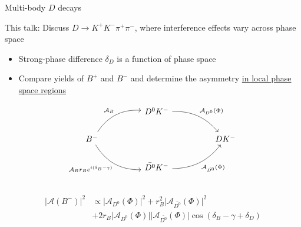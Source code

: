 \documentclass[xcolor={dvipsnames}]{beamer}
\begin{document}
\begin{frame}[fragile]{Multi-body $D$ decays}
  \begin{center}
    This talk: Discuss $D\to K^+K^-\pi^+\pi^-$, where interference effects vary across phase space
  \end{center}
  \vspace{-0.3cm}
  \begin{itemize}
    \setlength\itemsep{0.5em}
    \item{Strong-phase difference $\delta_D$ is a function of phase space}
    \item{Compare yields of $B^+$ and $B^-$ and determine the asymmetry \underline{in local phase space regions}}
  \end{itemize}
  \begin{equation*}
    \begin{tikzcd}[column sep=huge]
      & D^0K^- \arrow[dr, bend left = 25, "\mathcal{A}_{D^0}(\Phi)"] & \\
      B^- \arrow[ur, bend left, "\mathcal{A}_B"] \arrow[dr, bend right, "\mathcal{A}_B r_B e^{i(\delta_B - \gamma)}"'] & [5cm] & DK^- \\
      & \bar{D^0}K^- \arrow[ur, bend right = 25, "\mathcal{A}_{\bar{D^0}}(\Phi)"'] & \\
    \end{tikzcd}
  \end{equation*}
  \vspace{-0.9cm}
  \begin{align*}
    \lvert\mathcal{A}(B^-)\lvert^2&\propto\lvert\mathcal{A}_{D^0}(\Phi)\lvert^2 + r_B^2\lvert\mathcal{A}_{\bar{D^0}}(\Phi)\lvert^2 \\
    &+ 2r_B\lvert\mathcal{A}_{D^0}(\Phi)\lvert\lvert\mathcal{A}_{\bar{D^0}}(\Phi)\lvert\cos(\delta_B - \gamma + \delta_D)
  \end{align*}
\end{frame}
\end{document}
